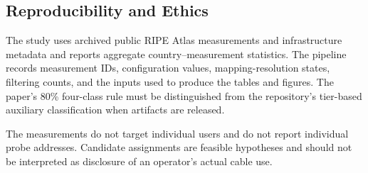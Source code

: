\subsection{Reproducibility and Ethics}

The study uses archived public RIPE Atlas measurements and infrastructure
metadata and reports aggregate country--measurement statistics. The pipeline
records measurement IDs, configuration values, mapping-resolution states,
filtering counts, and the inputs used to produce the tables and figures. The
paper's 80\% four-class rule must be distinguished from the repository's
tier-based auxiliary classification when artifacts are released.

The measurements do not target individual users and do not report individual
probe addresses. Candidate assignments are feasible hypotheses and should not
be interpreted as disclosure of an operator's actual cable use.

